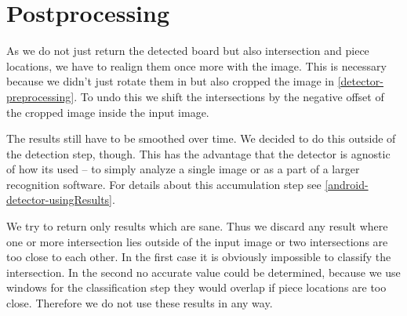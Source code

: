 	\section{Postprocessing}
	As we do not just return the detected board but also intersection and piece locations, we have to realign them once more with the image. This is necessary because we didn't just rotate them in but also cropped the image in \autoref{detector-preprocessing}. To undo this we shift the intersections by the negative offset of the cropped image inside the input image.

	The results still have to be smoothed over time. We decided to do this outside of the detection step, though. This has the advantage that the detector is agnostic of how its used -- to simply analyze a single image or as a part of a larger recognition software. For details about this accumulation step see \autoref{android-detector-usingResults}.

	We try to return only results which are sane. Thus we discard any result where one or more intersection lies outside of the input image or two intersections are too close to each other. In the first case it is obviously impossible to classify the intersection. In the second no accurate value could be determined, because we use windows for the classification step they would overlap if piece locations are too close. Therefore we do not use these results in any way.
